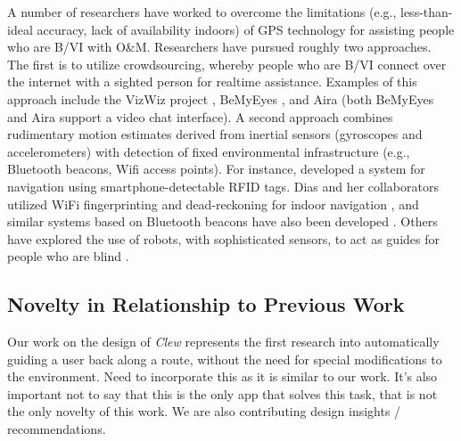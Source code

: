 \documentclass[chi_draft]{sigchi}
\newcommand{\BVI}{B/VI\xspace}
\newcommand{\OM}{O\&M\xspace}
\begin{document}
A number of researchers have worked to overcome the limitations (e.g., less-than-ideal accuracy, lack of availability indoors) of GPS technology for assisting people who are \BVI with \OM.  Researchers have pursued roughly two approaches.  The first is to utilize crowdsourcing, whereby people who are \BVI connect over the internet with a sighted person for realtime assistance.  Examples of this approach include the VizWiz project \cite{bigham2010vizwiz}, BeMyEyes \cite{bemyeyesaccessworld}, and Aira \cite{aira} (both BeMyEyes and Aira support a video chat interface).  A second approach combines rudimentary motion estimates derived from inertial sensors (gyroscopes and accelerometers) with detection of fixed environmental infrastructure (e.g., Bluetooth beacons, Wifi access points).  For instance, \cite{ganz2015percept, ganz2011percept, ganz2014percept} developed a system for navigation using smartphone-detectable RFID tags.  Dias and her collaborators utilized WiFi fingerprinting and dead-reckoning for indoor navigation \cite{Dias__2014_7778}, and similar systems based on Bluetooth beacons have also been developed \cite{ishihara2017beacon, ahmetovic2016navcog}.  Others have explored the use of robots, with sophisticated sensors, to act as guides for people who are blind \cite{Nanavati:2018:CIN:3173386.3176976}.


\subsection{Novelty in Relationship to Previous Work}
Our work on the design of \emph{Clew} represents the first research into automatically guiding a user back along a route, without the need for special modifications to the environment.  Need to incorporate this \cite{flores2018easy} as it is similar to our work.  It's also important not to say that this is the only app that solves this task, that is not the only novelty of this work.  We are also contributing design insights / recommendations.

\end{document}
